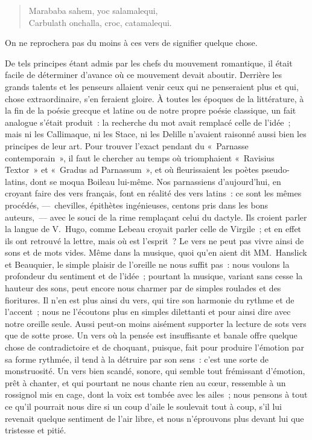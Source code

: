 \documentclass[french,twoside]{book} %
\begin{document}
\begin{verse}
Marababa sahem, yoc salamalequi,\\
Carbulath onchalla, croc, catamalequi.\\
\end{verse}

\noindent On ne reprochera pas du moins à ces vers de signifier quelque chose.\par
De tels principes étant admis par les chefs du mouvement romantique, il était facile de déterminer d’avance où ce mouvement devait aboutir. Derrière les grands talents et les penseurs allaient venir ceux qui ne penseraient plus et qui, chose extraordinaire, s’en feraient gloire. À toutes les époques de la littérature, à la fin de la poésie grecque et latine ou de notre propre poésie classique, un fait analogue s’était produit : la recherche du mot avait remplacé celle de l’idée ; mais ni les Callimaque, ni les Stace, ni les Delille n’avaient raisonné aussi bien les principes de leur art. Pour trouver l’exact pendant du « Parnasse contemporain », il faut le chercher au temps où  triomphaient « Ravisius Textor » et « Gradus ad Parnassum », et où fleurissaient les poètes pseudo-latins, dont se moqua Boileau lui-même. Nos parnassiens d’aujourd’hui, en croyant faire des vers français, font en réalité des vers latins : ce sont les mêmes procédés, — chevilles, épithètes ingénieuses, centons pris dans les bons auteurs, — avec le souci de la rime remplaçant celui du dactyle. Ils croient parler la langue de V. Hugo, comme Lebeau croyait parler celle de Virgile ; et en effet ils ont retrouvé la lettre, mais où est l’esprit ? Le vers ne peut pas vivre ainsi de sons et de mots vides. Même dans la musique, quoi qu’en aient dit MM. Hanslick et Beauquier, le simple plaisir de l’oreille ne nous suffit pas : nous voulons la profondeur du sentiment et de l’idée ; pourtant la musique, variant sans cesse la hauteur des sons, peut encore nous charmer par de simples roulades et des fioritures. Il n’en est plus ainsi du vers, qui tire son harmonie du rythme et de l’accent ; nous ne l’écoutons plus en simples dilettanti et pour ainsi dire avec notre oreille seule. Aussi peut-on moins aisément supporter la lecture de sots vers que de sotte prose. Un vers où la pensée est insuffisante et banale offre quelque chose de contradictoire et de choquant, puisque, fait pour produire l’émotion par sa forme rythmée, il tend à la détruire par son sens : c’est une sorte de monstruosité. Un vers bien scandé, sonore, qui semble tout frémissant d’émotion, prêt à chanter, et qui pourtant ne nous chante rien au cœur, ressemble à un rossignol mis en cage, dont la voix est tombée avec les ailes ; nous pensons à tout ce qu’il pourrait nous dire si un coup d’aile  le soulevait tout à coup, s’il lui revenait quelque sentiment de l’air libre, et nous n’éprouvons plus devant lui que tristesse et pitié.\par
\end{document}
